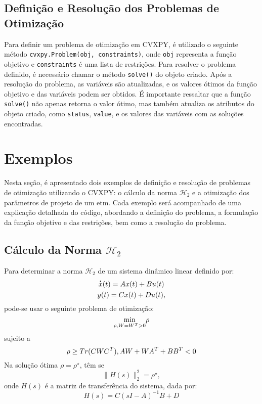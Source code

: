 \subsection{Definição e Resolução dos Problemas de Otimização}

Para definir um problema de otimização em CVXPY, é utilizado o seguinte método \texttt{cvxpy.Problem(obj, constraints)}, onde \texttt{obj} representa a função objetivo e \texttt{constraints} é uma lista de restrições. Para resolver o problema definido, é necessário chamar o método \texttt{solve()} do objeto criado. Após a resolução do problema, as variáveis são atualizadas, e os valores ótimos da função objetivo e das variáveis podem ser obtidos. É importante ressaltar que a função \texttt{solve()} não apenas retorna o valor ótimo, mas também atualiza os atributos do objeto criado, como \texttt{status}, \texttt{value}, e os valores das variáveis com as soluções encontradas.

\section{Exemplos}

Nesta seção, é apresentado dois exemplos de definição e resolução de problemas de otimização utilizando o CVXPY: o cálculo da norma $\mathcal{H}_{2}$ e a otimização dos parâmetros de projeto de um \acrshort{etm}. Cada exemplo será acompanhado de uma explicação detalhada do código, abordando a definição do problema, a formulação da função objetivo e das restrições, bem como a resolução do problema.

\subsection{Cálculo da Norma $\mathcal{H}_{2}$}

Para determinar a norma $\mathscr{H} _2$ de um sistema dinâmico linear definido por: \begin{gather} \dt{x}(t) = Ax(t) + Bu(t) \\ y(t) = Cx(t) + Du(t), \label{sistema_linear_h2}\end{gather} pode-se usar o seguinte problema de otimização: \begin{equation} \underset{\rho, \space W = W^T > 0}{\min} \space\space \rho \end{equation} sujeito a \begin{equation}
\rho \geq Tr(CWC^T), \space
AW + WA^T + BB^T < 0
\end{equation} Na solução ótima $\rho = \rho^\star$, têm se \begin{equation} \lVert H(s) \rVert ^ 2 _ 2 = \rho^\star, \end{equation} onde $H(s)$ é a matriz de transferência do sistema, dada por: \begin{equation} H(s) = C(sI- A)^{-1}B +D  \end{equation}

